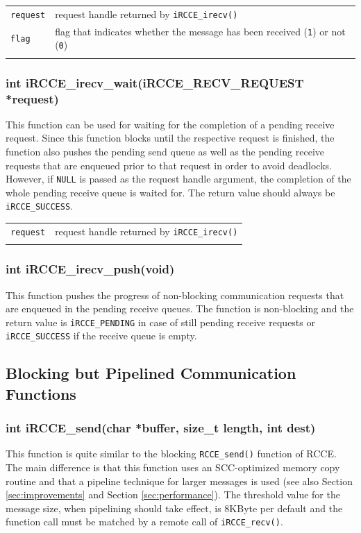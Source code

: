 \documentclass[fontsize=10pt, paper=a4, DIV12, pagesize=auto]{scrartcl}
\begin{document}
\begin{tabular}{ll}
\texttt{request} & request handle returned by \texttt{iRCCE\_irecv()} \\
\texttt{flag}    & flag that indicates whether the message has been received (\texttt{1}) or not (\texttt{0})\\
\hspace{2.0cm}
\end{tabular}


\subsubsection{int iRCCE\_irecv\_wait(iRCCE\_RECV\_REQUEST *request)}\vspace{-0.3cm}
This function can be used for waiting for the completion of a pending receive request.
Since this function blocks until the respective request is finished, the function also pushes the pending send queue as well as the pending receive requests that are enqueued prior to that request in order to avoid deadlocks.
However, if \texttt{NULL} is passed as the request handle argument, the completion of the whole pending receive queue is waited for.
The return value should always be \texttt{iRCCE\_SUCCESS}.

\begin{tabular}{ll}
\texttt{request} & request handle returned by \texttt{iRCCE\_irecv()} \\
\hspace{2.0cm}
\end{tabular}


\subsubsection{int iRCCE\_irecv\_push(void)}\vspace{-0.3cm}
This function pushes the progress of non-blocking communication requests that are enqueued in the pending receive queues.
The function is non-blocking and the return value is \texttt{iRCCE\_PENDING} in case of still pending receive requests or \texttt{iRCCE\_SUCCESS} if the receive queue is empty.

\subsection{Blocking but Pipelined Communication Functions}

\subsubsection{int iRCCE\_send(char *buffer, size\_t length, int dest)}\vspace{-0.3cm}
This function is quite similar to the blocking \texttt{RCCE\_send()} function of RCCE.
The main difference is that this function uses an SCC-optimized memory copy routine and that a pipeline technique for larger messages is used (see also Section \ref{sec:improvements} and Section \ref{sec:performance}).
The threshold value for the message size, when pipelining should take effect, is 8KByte per default and the function call must be matched by a remote call of \texttt{iRCCE\_recv()}.
\end{document}

